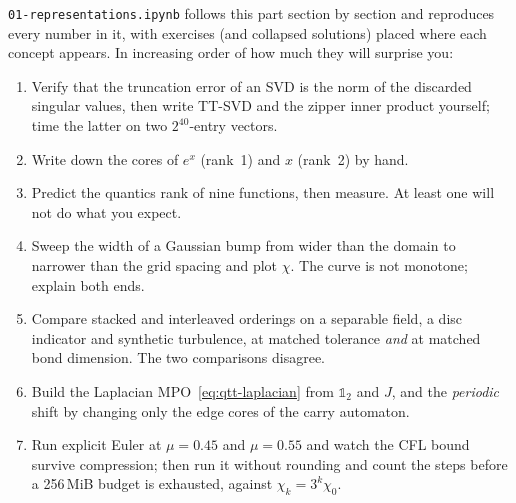 \begin{exercise}
  \texttt{01-representations.ipynb} follows this part section by section and
  reproduces every number in it, with exercises (and collapsed solutions)
  placed where each concept appears. In increasing order of how much they will
  surprise you:

  \begin{enumerate}
    \item Verify that the truncation error of an SVD is the norm of the
      discarded singular values, then write TT-SVD and the zipper inner product
      yourself; time the latter on two $2^{40}$-entry vectors.
    \item Write down the cores of $e^{x}$ (rank~1) and $x$ (rank~2) by hand.
    \item Predict the quantics rank of nine functions, then measure. At least
      one will not do what you expect.
    \item Sweep the width of a Gaussian bump from wider than the domain to
      narrower than the grid spacing and plot $\chi$. The curve is not
      monotone; explain both ends.
    \item Compare stacked and interleaved orderings on a separable field, a disc
      indicator and synthetic turbulence, at matched tolerance \emph{and} at
      matched bond dimension. The two comparisons disagree.
    \item Build the Laplacian MPO~\eqref{eq:qtt-laplacian} from $\mathbb{1}_2$
      and $J$, and the \emph{periodic} shift by changing only the edge cores
      of the carry automaton.
    \item Run explicit Euler at $\mu = 0.45$ and $\mu = 0.55$ and watch the
      CFL bound survive compression; then run it without rounding and count the
      steps before a 256\,MiB budget is exhausted, against $\chi_k = 3^k\chi_0$.
  \end{enumerate}
\end{exercise}

